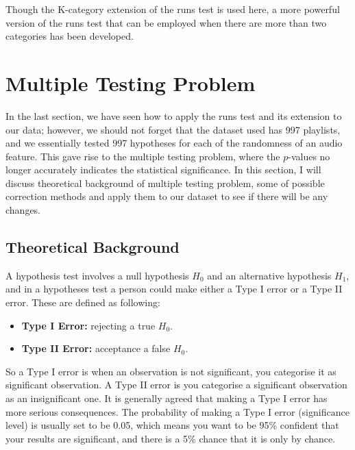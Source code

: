 \documentclass[12pt]{article}
\theoremstyle{plain}
\theoremstyle{definition}
\theoremstyle{remark}
\begin{document}
Though the K-category extension of the runs test is used here, a more powerful version\cite{3.4} of the runs test that can be employed when there are more than two categories has been developed. 





\newpage







\section{Multiple Testing Problem}
In the last section, we have seen how to apply the runs test and its extension to our data; however, we should not forget that the dataset used has 997 playlists, and we essentially tested 997 hypotheses for each of the randomness of an audio feature. This gave rise to the multiple testing problem, where the $p$-values no longer accurately indicates the statistical significance\cite{5.2}. In this section, I will discuss theoretical background of multiple testing problem, some of possible correction methods and apply them to our dataset to see if there will be any changes.


\subsection{Theoretical Background}
A hypothesis test involves a null hypothesis $H_0$ and an alternative hypothesis $H_1$, and in a hypotheses test a person could make either a Type I error or a Type II error. These are defined as following\cite{5.2}:
\begin{itemize}
    \item \textbf{Type I Error:} rejecting a true $H_0$.
    \item \textbf{Type II Error:} acceptance a false $H_0$.
\end{itemize}
So a Type I error is when an observation is not significant, you categorise it as significant observation. A Type II error is you categorise a significant observation as an insignificant one. It is generally agreed that making a Type I error has more serious consequences.\cite{5.2} The probability of making a Type I error (significance level) is usually set to be 0.05, which means you want to be 95\% confident that your results are significant, and there is a 5\% chance that it is only by chance.\cite{5.4}
\end{document}
